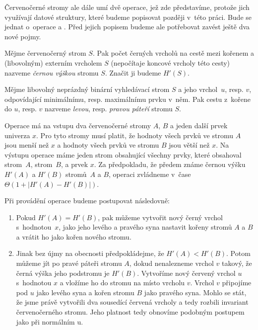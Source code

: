 Červenočerné stromy ale dále umí dvě operace, jež zde představíme, protože
jich využívají datové struktury, které budeme popisovat později v~této práci. Bude se jednat o~operace \emph{} a \emph{}.
Před jejich popisem budeme ale potřebovat zavést ještě dva nové pojmy.

\begin{definice}
Mějme červenočerný strom $S$. Pak počet černých vrcholů na cestě mezi kořenem a (libovolným) externím vrcholem $S$ (nepočítaje koncové vrcholy této cesty) nazveme \emph{černou výškou} stromu $S$. Značit ji budeme $H'(S)$.
\end{definice}


\begin{definice}
Mějme libovolný neprázdný binární vyhledávací strom $S$ a jeho vrchol~$u$, resp. $v$, odpovídající minimálnímu, resp. maximálnímu prvku v~něm. Pak cestu z~kořene do $u$, resp. $v$ nazveme \emph{levou}, resp. \emph{pravou páteří} stromu $S$.
\end{definice}

Operace  má na vstupu dva červenočerné
stromy $A$, $B$ a jeden další prvek univerza $x$. Pro tyto stromy musí platit,
že hodnoty všech prvků ve stromu $A$ jsou menší než $x$ a hodnoty všech prvků
ve stromu $B$ jsou větší než $x$. Na výstupu operace  máme jeden strom
obsahující všechny prvky, které obsahoval strom~$A$, strom~$B$, a prvek $x$. Za
předpokladu, že předem známe černou výšku $H'(A)$ a $H'(B)$ stromů~$A$
a $B$, operaci  zvládneme v~čase $\Theta(1+|H'(A) -
H'(B)|)$.

Při provádění operace  budeme postupovat následovně:

\begin{enumerate}
\item Pokud $H'(A) = H'(B)$, pak můžeme vytvořit nový černý vrchol s~hodnotou~$x$, jako jeho levého a pravého syna nastavit kořeny stromů $A$ a $B$ a vrátit ho jako kořen nového stromu.
\item Jinak bez újmy na obecnosti předpokládejme, že $H'(A)<H'(B)$. Potom můžeme jít po pravé páteři stromu $A$, dokud nenalezneme vrchol $v$ takový, že černá výška jeho podstromu je $H'(B)$. Vytvoříme nový červený vrchol $u$ s~hodnotou $x$ a vložíme ho do stromu na místo vrcholu $v$. Vrchol $v$ připojíme pod $u$ jako levého syna a kořen stromu $B$ jako pravého syna. Mohlo se stát, že jsme právě vytvořili dva sousedící červená vrcholy a tedy rozbili invariant červenočerného stromu. Jeho platnost tedy obnovíme podobným postupem jako při normálním u.
\end{enumerate}

